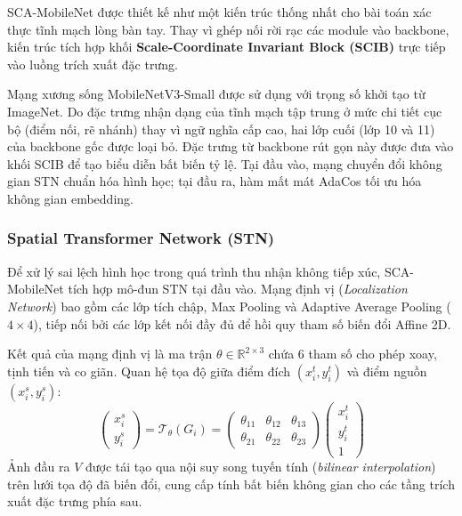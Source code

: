 \documentclass[12pt,a4paper]{article}
\begin{document}
SCA-MobileNet được thiết kế như một kiến trúc thống nhất cho bài toán xác thực tĩnh mạch lòng bàn tay. Thay vì ghép nối rời rạc các module vào backbone, kiến trúc tích hợp khối \textbf{Scale-Coordinate Invariant Block (SCIB)} trực tiếp vào luồng trích xuất đặc trưng.

Mạng xương sống MobileNetV3-Small \cite{b10} được sử dụng với trọng số khởi tạo từ ImageNet. Do đặc trưng nhận dạng của tĩnh mạch tập trung ở mức chi tiết cục bộ (điểm nối, rẽ nhánh) thay vì ngữ nghĩa cấp cao, hai lớp cuối (lớp 10 và 11) của backbone gốc được loại bỏ. Đặc trưng từ backbone rút gọn này được đưa vào khối SCIB để tạo biểu diễn bất biến tỷ lệ. Tại đầu vào, mạng chuyển đổi không gian STN \cite{b9} chuẩn hóa hình học; tại đầu ra, hàm mất mát AdaCos \cite{b11} tối ưu hóa không gian embedding.

\subsubsection{Spatial Transformer Network (STN)}
Để xử lý sai lệch hình học trong quá trình thu nhận không tiếp xúc, SCA-MobileNet tích hợp mô-đun STN \cite{b9} tại đầu vào. Mạng định vị (\textit{Localization Network}) bao gồm các lớp tích chập, Max Pooling và Adaptive Average Pooling ($4 \times 4$), tiếp nối bởi các lớp kết nối đầy đủ để hồi quy tham số biến đổi Affine 2D.

Kết quả của mạng định vị là ma trận $\theta \in \mathbb{R}^{2\times3}$ chứa 6 tham số cho phép xoay, tịnh tiến và co giãn. Quan hệ tọa độ giữa điểm đích $(x_i^t, y_i^t)$ và điểm nguồn $(x_i^s, y_i^s)$:
\begin{equation}
\begin{pmatrix} x_i^s \\ y_i^s \end{pmatrix} = \mathcal{T}_\theta(G_i) = \begin{pmatrix} \theta_{11} & \theta_{12} & \theta_{13} \\ \theta_{21} & \theta_{22} & \theta_{23} \end{pmatrix} \begin{pmatrix} x_i^t \\ y_i^t \\ 1 \end{pmatrix}
\label{eq:stn}
\end{equation}
Ảnh đầu ra $V$ được tái tạo qua nội suy song tuyến tính (\textit{bilinear interpolation}) trên lưới tọa độ đã biến đổi, cung cấp tính bất biến không gian cho các tầng trích xuất đặc trưng phía sau.
\end{document}
